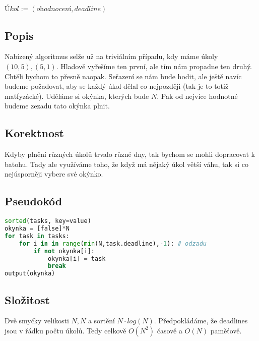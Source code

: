 \documentclass[a4paper]{article}
\begin{document}
\text{}\vspace{-0.1cm}
{\fontsize{12}{15}\selectfont \hspace{-0.5cm}}

\section{}
$\textit{Úkol} := (\textit{ohodnocení}, \textit{deadline})$
\subsection{Popis}
Nabízený algoritmus selže už na triviálním případu, kdy máme úkoly $(10, 5), (5,1)$. Hladově vyřešíme ten první, ale tím nám propadne ten druhý. Chtěli bychom to přesně naopak. Seřazení se nám bude hodit, ale ještě navíc budeme požadovat, aby se každý úkol dělal co nejpozději (tak je to totiž matfyzácké). Uděláme si okýnka, kterých bude $N$. Pak od nejvíce hodnotné budeme zezadu tato okýnka plnit.

\subsection{Korektnost}
Kdyby plnění různých úkolů trvalo různé dny, tak bychom se mohli dopracovat k batohu. Tady ale využíváme toho, že když má nějaký úkol větší váhu, tak si co nejúsporněji vybere své okýnko.

\subsection{Pseudokód}
\begin{lstlisting}[language=Python]
sorted(tasks, key=value)
okynka = [false]*N
for task in tasks:
	for i in in range(min(N,task.deadline),-1): # odzadu
		if not okynka[i]:
			okynka[i] = task
			break
output(okynka)
\end{lstlisting}

\subsection{Složitost}
Dvě smyčky velikosti $N, N$ a sortění $N\cdot log(N)$. Předpokládáme, že deadlines jsou v řádku počtu úkolů. Tedy celkově $O(N^2)$ časově a $O(N)$ paměťově.


\section{} 
\end{document}

